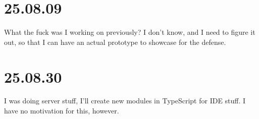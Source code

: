 \section{25.08.09}

What the fuck was I working on previously? I don't know, and I need to figure
it out, so that I can have an actual prototype to showcase for the defense.


\section{25.08.30}

I was doing server stuff, I'll create new modules in TypeScript for IDE stuff.
I have no motivation for this, however.
